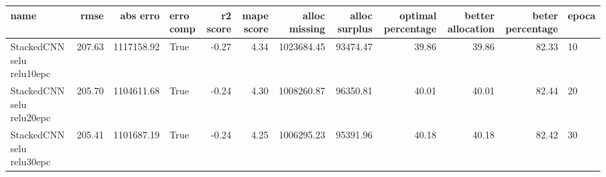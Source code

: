\begin{tabular}{lrrlrrrrrrrl}
\toprule
name & rmse & abs erro & erro comp & r2 score & mape score & alloc missing & alloc surplus & optimal percentage & better allocation & beter percentage & epoca \\
\midrule
StackedCNN selu relu10epc & 207.63 & 1117158.92 & True & -0.27 & 4.34 & 1023684.45 & 93474.47 & 39.86 & 39.86 & 82.33 & 10 \\
StackedCNN selu relu20epc & 205.70 & 1104611.68 & True & -0.24 & 4.30 & 1008260.87 & 96350.81 & 40.01 & 40.01 & 82.44 & 20 \\
StackedCNN selu relu30epc & 205.41 & 1101687.19 & True & -0.24 & 4.25 & 1006295.23 & 95391.96 & 40.18 & 40.18 & 82.42 & 30 \\
\bottomrule
\end{tabular}
